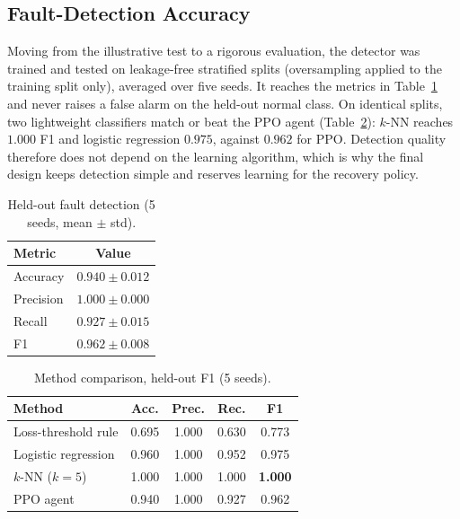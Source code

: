 \documentclass[12pt,a4paper]{report}
\begin{document}
\subsection{Fault-Detection Accuracy}
Moving from the illustrative test to a rigorous evaluation, the detector was trained and
tested on leakage-free stratified splits (oversampling applied to the training split only),
averaged over five seeds. It reaches the metrics in Table~\ref{tab:detect} and never raises a
false alarm on the held-out normal class. %
On identical splits, two lightweight classifiers match or beat the PPO agent
(Table~\ref{tab:baselines}): $k$-NN reaches $1.000$ F1 and logistic regression $0.975$,
against $0.962$ for PPO. %
Detection quality therefore does not depend on the learning algorithm, which is why the
final design keeps detection simple and reserves learning for the recovery policy.

\begin{table}[t]
\centering
\caption{Held-out fault detection (5 seeds, mean $\pm$ std).}
\label{tab:detect}
\begin{tabular}{lc}
\toprule
Metric & Value \\
\midrule
Accuracy & $0.940 \pm 0.012$ \\
Precision & $1.000 \pm 0.000$ \\
Recall & $0.927 \pm 0.015$ \\
F1 & $0.962 \pm 0.008$ \\
\bottomrule
\end{tabular}
\end{table}

\begin{table}[t]
\centering
\caption{Method comparison, held-out F1 (5 seeds).}
\label{tab:baselines}
\begin{tabular}{lcccc}
\toprule
Method & Acc. & Prec. & Rec. & F1 \\
\midrule
Loss-threshold rule & 0.695 & 1.000 & 0.630 & 0.773 \\
Logistic regression & 0.960 & 1.000 & 0.952 & 0.975 \\
$k$-NN ($k{=}5$) & 1.000 & 1.000 & 1.000 & \textbf{1.000} \\
PPO agent & 0.940 & 1.000 & 0.927 & 0.962 \\
\bottomrule
\end{tabular}
\end{table}
\end{document}
